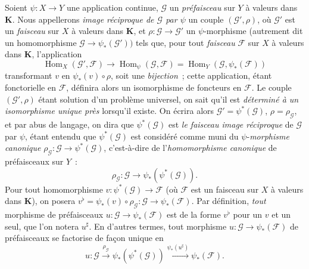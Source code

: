 \begin{env}[3.5.3]
\label{0.3.5.3-fr}
Soient $\psi:X\to Y$ une application continue, $\mathcal{G}$ un
\emph{préfaisceau} sur $Y$ à valeurs dans $\boldsymbol{K}$. Nous appellerons
\emph{image réciproque de $\mathcal{G}$ par $\psi$} un couple
$(\mathcal{G}',\rho)$, où $\mathcal{G}'$ est un \emph{faisceau} sur $X$ à
valeurs dans $\boldsymbol{K}$, et
$\rho:\mathcal{G}\to\mathcal{G}'$ un $\psi$-morphisme (autrement dit un
homomorphisme $\mathcal{G}\to\psi_*(\mathcal{G}'))$ tels que, pour tout
\emph{faisceau} $\mathcal{F}$ sur $X$ à valeurs dans $\boldsymbol{K}$,
l'application
\begin{equation*}
  \operatorname{Hom}_X(\mathcal{G}',\mathcal{F})
  \longrightarrow \operatorname{Hom}_\psi(\mathcal{G},\mathcal{F})
  =\operatorname{Hom}_Y(\mathcal{G},\psi_*(\mathcal{F}))
\tag{3.5.3.1}\label{0.3.5.3.1-fr}
\end{equation*}
transformant $v$ en $\psi_*(v)\circ\rho$, soit une \emph{bijection}~; cette
application, étant fonctorielle en $\mathcal{F}$, définira alors un
isomorphisme de foncteurs en $\mathcal{F}$. Le couple
$(\mathcal{G}',\rho)$ étant solution d'un problème universel, on sait qu'il
est \emph{déterminé à un isomorphisme unique près} lorsqu'il existe. On écrira
alors $\mathcal{G}'=\psi^*(\mathcal{G})$, $\rho=\rho_{\mathcal{G}}$, et par
abus de langage, on dira que $\psi^*(\mathcal{G})$ est \emph{le faisceau image
réciproque} de $\mathcal{G}$ par $\psi$, étant entendu que
$\psi^*(\mathcal{G})$ est considéré comme muni du $\psi$-\emph{morphisme
canonique}
$\rho_{\mathcal{G}}:\mathcal{G}\to\psi^*(\mathcal{G})$, c'est-à-dire de
l'\emph{homomorphisme canonique} de préfaisceaux sur $Y$~:
\begin{equation*}
  \rho_{\mathcal{G}}:\mathcal{G}\to\psi_*(\psi^*(\mathcal{G})).
\tag{3.5.3.2}\label{0.3.5.3.2-fr}
\end{equation*}
Pour tout homomorphisme
$v:\psi^*(\mathcal{G})\to\mathcal{F}$ (où $\mathcal{F}$ est un faisceau sur
$X$ à valeurs dans $\boldsymbol{K}$), on posera
$v^\flat=\psi_*(v)\circ\rho_{\mathcal{G}}:
\mathcal{G}\to\psi_*(\mathcal{F})$. Par définition, \emph{tout} morphisme de
préfaisceaux $u:\mathcal{G}\to\psi_*(\mathcal{F})$ est de la forme $v^\flat$ pour
un $v$ et un seul, que l'on notera $u^\sharp$. En d'autres termes, tout
morphisme $u:\mathcal{G}\to\psi_*(\mathcal{F})$ de préfaisceaux se factorise
de façon unique en
\begin{equation*}
  u:\mathcal{G}\xrightarrow{\rho_{\mathcal{G}}}
  \psi_*(\psi^*(\mathcal{G}))
  \xrightarrow{\psi_*(u^\sharp)}\psi_*(\mathcal{F}).
\tag{3.5.3.3}\label{0.3.5.3.3-fr}
\end{equation*}
\end{env}

